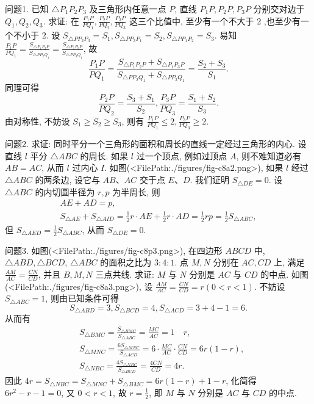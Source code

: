 
问题1. 已知 $\triangle P_1 P_2 P_3$ 及三角形内任意一点 $P$, 直线 $P_1 P, P_2 P, P_3 P$ 分别交对边于 $Q_1, Q_2, Q_3$. 求证: 在 $\frac{P_1 P}{P Q_1}, \frac{P_2 P}{P Q_2}, \frac{P_3 P}{P Q_3}$ 这三个比值中, 至少有一个不大于 2 ,也至少有一个不小于 2. 
设 $S_{\triangle P P_2 P_3}=S_1, S_{\triangle P P_3 P_1}=S_2, S_{\triangle P P_1 P_2}=S_3$.
易知 $\frac{P_1 P}{P Q_1}=\frac{S_{\triangle P_1 P_2 P}}{S_{\triangle P P_2 Q_1}}=\frac{S_{\triangle P_1 P_3 P}}{S_{\triangle P P_3 Q_1}}$, 故
$$
\frac{P_1 P}{P Q_1}=\frac{S_{\triangle P_1 P_2 P}+S_{\triangle P_1 P_3 P}}{S_{\triangle P P_2 Q_1}+S_{\triangle P P_3 Q_1}}=\frac{S_2+S_3}{S_1} .
$$
同理可得
$$
\frac{P_2 P}{P Q_2}=\frac{S_3+S_1}{S_2}, \frac{P_3 P}{P Q_3}=\frac{S_1+S_2}{S_3} .
$$
由对称性, 不妨设 $S_1 \geqslant S_2 \geqslant S_3$, 则有 $\frac{P_1 P}{P Q_1} \leqslant 2, \frac{P_3 P}{P Q_3} \geqslant 2$.



问题2. 求证: 同时平分一个三角形的面积和周长的直线一定经过三角形的内心.
设直线 $l$ 平分 $\triangle A B C$ 的周长.
如果 $l$ 过一个顶点, 例如过顶点 $A$, 则不难知道必有 $A B=A C$, 从而 $l$ 过内心 $I$.
如图(<FilePath:./figures/fig-c8a2.png>), 如果 $l$ 经过 $\triangle A B C$ 的两条边, 设它与 $A B 、 A C$ 交于点 $E 、 D$. 我们证明 $S_{\triangle D E}=0$.
设 $\triangle A B C$ 的内切圆半径为 $r, p$ 为半周长, 则
$$
\begin{gathered}
A E+A D=p, \\
S_{\triangle A E}+S_{\triangle A I D}=\frac{1}{2} r \cdot A E+\frac{1}{2} r \cdot A D=\frac{1}{2} r p=\frac{1}{2} S_{\triangle A B C},
\end{gathered}
$$
但 $S_{\triangle A E D}=\frac{1}{2} S_{\triangle A B C}$, 从而 $S_{\triangle D E}=0$.



问题3. 如图(<FilePath:./figures/fig-c8p3.png>),  在四边形 $A B C D$ 中, $\triangle A B D, \triangle B C D$, $\triangle A B C$ 的面积之比为 $3: 4: 1$. 点 $M, N$ 分别在 $A C, C D$ 上, 满足 $\frac{A M}{A C}=\frac{C N}{C D}$, 并且 $B, M, N$ 三点共线.
求证: $M$ 与 $N$ 分别是 $A C$ 与 $C D$ 的中点.
如图(<FilePath:./figures/fig-c8a3.png>), 设 $\frac{A M}{A C}=\frac{C N}{C D}=r(0<r<1)$.
不妨设 $S_{\triangle A B C}=1$, 则由已知条件可得
$$
S_{\triangle A B D}=3, S_{\triangle B C D}=4, S_{\triangle A C D}=3+4-1=6 .
$$
从而有
$$
\begin{aligned}
& S_{\triangle B M C}=\frac{S_{\triangle B M C}}{S_{\triangle A B C}}=\frac{M C}{A C}=1 \quad r, \\
& S_{\triangle M N C}=\frac{6 S_{\triangle M N C}}{S_{\triangle A C D}}=6 \cdot \frac{M C}{A C} \cdot \frac{C N}{C D}=6 r(1-r), \\
& S_{\triangle N B C}=\frac{4 S_{\triangle N B C}}{S_{\triangle B C D}}=\frac{4 C N}{C D}=4 r .
\end{aligned}
$$
因此 $4 r=S_{\triangle N B C}=S_{\triangle M N C}+S_{\triangle B M C}=6 r(1-r)+1-r$,
化简得 $6 r^2-r-1=0$, 又 $0<r<1$, 故 $r=\frac{1}{2}$, 即 $M$ 与 $N$ 分别是 $A C$ 与 $C D$ 的中点.



